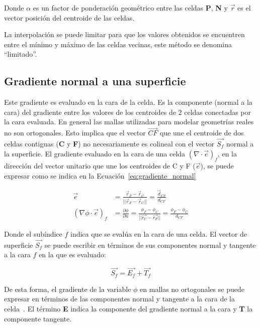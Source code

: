 Donde $\alpha$ es un factor de ponderación geométrico entre las celdas
\textbf{P}, \textbf{N} y $\vec{r}$ es el vector posición del centroide de las
celdas.

La interpolación se puede limitar para que los valores obtenidos se encuentren
entre el mínimo y máximo de las celdas vecinas, este método se denomina
``limitado''.

\subsection{Gradiente normal a una superficie}
%
Este gradiente es evaluado en la cara de la celda.
%
Es la componente (normal a la cara) del gradiente entre los valores de los
centroides de 2 celdas conectadas por la cara evaluada.
%
En general las mallas utilizadas para modelar geometrías reales no son
ortogonales.
%
Esto implica que el vector $\vec{CF}$ que une el centroide de dos celdas
contiguas (\textbf{C} y \textbf{F}) no necesariamente es colineal con el vector
$\vec{S_{f}}$ normal a la superficie.
%
El gradiente  evaluado en la cara de una celda $(\nabla\cdot\vec{e})_{f}$, en la
dirección del vector unitario que une los centroides de C y F ($\vec{e}$), se
puede expresar como se indica en la Ecuación~\ref{eq:gradiente_normal}

\begin{align}
    \label{eq:gradiente_normal}
  \vec{e} &= \frac{\vec{r}_{F}-\vec{r}_{C}}{||\vec{r}_{F}-\vec{r}_{C}||} = \frac{\vec{d}_{CF}}{d_{CF}} \\
  (\nabla \phi \cdot \vec{e})_{f} &= \frac{\partial \phi}{\partial n} = \frac{\phi_{F} - \phi_{C}}{||\vec{r_{C}}-\vec{r_{F}}||} = \frac{\phi_{F} - \phi_{C}}{d_{CF}}
\end{align}

Donde el subíndice $f$ indica que se evalúa en la cara de una celda.
%
El vector de superficie $\vec{S_{f}}$ se puede escribir en términos de sus
componentes normal y tangente a la cara $f$ en la que es evaluado:

\begin{equation}
    \vec{S_{f}}= \vec{E_{f}} + \vec{T_{f}}
\end{equation}

De esta forma, el gradiente de la variable $\phi$ en mallas no ortogonales se
puede expresar en términos de las componentes normal y tangente a la cara de la
celda~\parencite{moukalled}.
%
El término \textbf{E} indica la componente del gradiente normal a la cara y
\textbf{T} la componente tangente.

